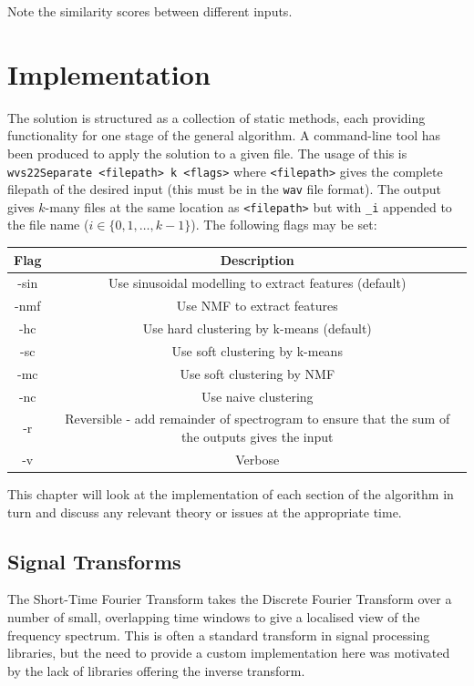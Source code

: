 \documentclass[10pt,twoside,a4paper]{report}
\begin{document}
Note the similarity scores between different inputs.

\chapter{Implementation}

The solution is structured as a collection of static methods, each providing functionality for one stage of the general algorithm. A command-line tool has been produced to apply the solution to a given file. The usage of this is \texttt{wvs22Separate <filepath> k <flags>} where \texttt{<filepath>} gives the complete filepath of the desired input (this must be in the \texttt{wav} file format). The output gives $ k $-many files at the same location as \texttt{<filepath>} but with \texttt{\_i} appended to the file name ($ i \in \{0, 1, \ldots, k-1\} $). The following flags may be set:

\begin{tabular}{|c|c|}
\hline Flag & Description \\ 
\hline -sin & Use sinusoidal modelling to extract features (default) \\ 
\hline -nmf & Use NMF to extract features \\ 
\hline -hc & Use hard clustering by k-means (default) \\ 
\hline -sc & Use soft clustering by k-means \\ 
\hline -mc & Use soft clustering by NMF \\ 
\hline -nc & Use naive clustering \\ 
\hline -r & Reversible - add remainder of spectrogram to ensure that the sum of the outputs gives the input \\ 
\hline -v & Verbose \\
\hline 
\end{tabular}

This chapter will look at the implementation of each section of the algorithm in turn and discuss any relevant theory or issues at the appropriate time.

\section{Signal Transforms}

The Short-Time Fourier Transform takes the Discrete Fourier Transform over a number of small, overlapping time windows to give a localised view of the frequency spectrum. This is often a standard transform in signal processing libraries, but the need to provide a custom implementation here was motivated by the lack of libraries offering the inverse transform.
\end{document}
